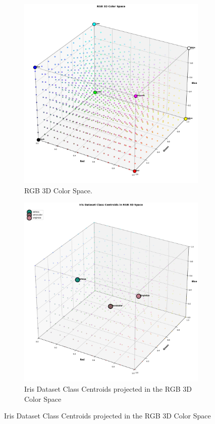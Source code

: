 \begin{figure}
    \vspace{0.5cm} %

    \begin{subfigure}[c]{0.45\textwidth}
        \includegraphics[width=\textwidth]{images/RGB 3D Color Space.png}
        \caption{RGB 3D Color Space.}
    \end{subfigure}
    \hfill
    \begin{subfigure}[c]{0.45\textwidth}
        \includegraphics[width=\textwidth]{images/Iris Dataset Class Centroids in RGB 3D Space.png}
        \caption{Iris Dataset Class Centroids projected in the RGB 3D Color Space}
    \end{subfigure}


\end{figure}
